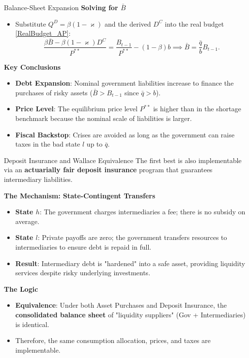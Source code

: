 \documentclass[11pt,aspectratio=169]{beamer}
\begin{document}
\begin{frame}{Balance-Sheet Expansion}
\small
\textbf{Solving for $\bar{B}$}
\begin{itemize}
    \item Substitute $Q^D = \beta(1-\varkappa)$ and the derived $D^C$ into the real budget \eqref{RealBudget_AP}:
    \begin{equation}
    \frac{\beta \bar{B} - \beta(1-\varkappa)D^C}{P^{**}} = \frac{B_{t-1}}{P^{**}} - (1-\beta)b \implies \bar{B} = \frac{\bar{q}}{b} B_{t-1}.
    \end{equation}
\end{itemize}

\vspace{0.2cm}
\textbf{Key Conclusions}
\begin{itemize}
    \item \textbf{Debt Expansion}: Nominal government liabilities increase to finance the purchases of risky assets ($\bar{B} > B_{t-1}$ since $\bar{q} > b$).
    \item \textbf{Price Level}: The equilibrium price level $P^{**}$ is higher than in the shortage benchmark because the nominal scale of liabilities is larger.
    \item \textbf{Fiscal Backstop}: Crises are avoided as long as the government can raise taxes in the bad state $l$ up to $\bar{q}$.
\end{itemize}
\end{frame}

\begin{frame}{Deposit Insurance and Wallace Equivalence}
\small
The first best is also implementable via an \textbf{actuarially fair deposit insurance} program that guarantees intermediary liabilities.

\vspace{0.2cm}
\textbf{The Mechanism: State-Contingent Transfers}
\begin{itemize}
    \item \textbf{State $h$}: The government charges intermediaries a fee; there is no subsidy on average.
    \item \textbf{State $l$}: Private payoffs are zero; the government transfers resources to intermediaries to ensure debt is repaid in full.
    \item \textbf{Result}: Intermediary debt is "hardened" into a safe asset, providing liquidity services despite risky underlying investments.
\end{itemize}

\vspace{0.2cm}
\textbf{The \textcite{wallace1981} Logic}
\begin{itemize}
    \item \textbf{Equivalence}: Under both Asset Purchases and Deposit Insurance, the \textbf{consolidated balance sheet} of "liquidity suppliers" (Gov + Intermediaries) is identical.
    \item Therefore, the same consumption allocation, prices, and taxes are implementable.
\end{itemize}
\end{frame}
\end{document}
